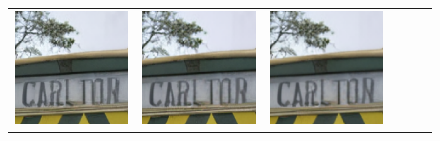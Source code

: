 \begin{figure}[!ht]
\begin{tabular}[t]{c c c c c c}
    \includegraphics[width=\xwidth]{cp2/figures/sr/scaling_sr_c160_2.png} &
    \includegraphics[width=\xwidth]{cp2/figures/sr/scaling_sr_c192_2.png} &
    \includegraphics[width=\xwidth]{cp2/figures/sr/scaling_sr_c224_2.png}

\end{tabular}
\end{figure}
